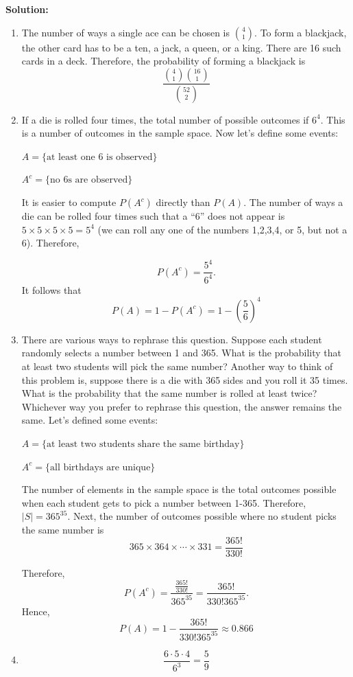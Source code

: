 \documentclass[
  12pt,
]{krantzNoCorner}
\begin{document}
\textbf{Solution:}

\begin{enumerate}
\def\labelenumi{\arabic{enumi}.}
\item
  The number of ways a single ace can be chosen is \(\binom{4}{1}.\) To
  form a blackjack, the other card has to be a ten, a jack, a queen,
  or a king. There are 16 such cards in a deck. Therefore, the
  probability of forming a blackjack is
  \[\frac{\binom{4}{1}\binom{16}{1}}{\binom{52}{2}}\]
\item
  If a die is rolled four times, the total number of possible outcomes
  if \(6^4.\) This is a number of outcomes in the sample space.
  Now let's define some events:

  \(A=\{\mbox{at least one 6 is observed}\}\)

  \(A^c=\{\mbox{no 6s are observed}\}\)

  It is easier to compute \(P(A^c)\) directly than \(P(A).\) The number of
  ways a die can be rolled four times such that a ``6'' does not appear
  is \(5\times 5\times 5\times 5 = 5^4\) (we can roll any one of the
  numbers 1,2,3,4, or 5, but not a 6). Therefore,

  \[P(A^c)=\frac{5^4}{6^4}.\]It follows that
  \[P(A)=1-P(A^c)=1-\left(\frac{5}{6}\right)^4\]
\item
  There are various ways to rephrase this question. Suppose each
  student randomly selects a number between 1 and 365. What is the
  probability that at least two students will pick the same number?
  Another way to think of this problem is, suppose there is a die with
  365 sides and you roll it 35 times. What is the probability that the
  same number is rolled at least twice? Whichever way you prefer to
  rephrase this question, the answer remains the same. Let's defined
  some events:

  \(A=\{\mbox{at least two students share the same birthday}\}\)

  \(A^c=\{\mbox{all birthdays are unique}\}\)

  The number of elements in the sample space is the total outcomes
  possible when each student gets to pick a number between 1-365.
  Therefore, \(|S|=365^{35}.\) Next, the number of outcomes possible
  where no student picks the same number is
  \[365\times 364\times\cdots\times 331 = \frac{365!}{330!}\]

  Therefore,
  \[P(A^c)=\frac{\frac{365!}{330!}}{365^{35}}=\frac{365!}{330!365^{35}}.\]
  Hence, \[P(A)=1-\frac{365!}{330!365^{35}}\approx 0.866\]
\item
  \[\frac{6\cdot 5\cdot 4}{6^3}= \frac{5}{9}\]
\end{enumerate}
\end{document}
